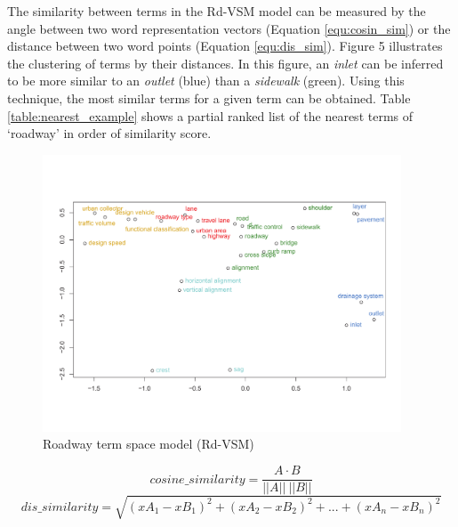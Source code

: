 \documentclass[Journal, BackFigs,NoLists, DoubleSpace]{ascelike}%
\begin{document}
\par
The similarity between terms in the Rd-VSM model can be measured by the angle between two word representation vectors (Equation \ref{equ:cosin_sim}) or the distance between two word points (Equation \ref{equ:dis_sim}). Figure 5 illustrates the clustering of terms by their distances. In this figure, an \textit{inlet} can be inferred to be more similar to an \textit{outlet} (blue) than a \textit{sidewalk} (green). Using this technique, the most similar terms for a given term can be obtained. Table \ref{table:nearest_example} shows a partial ranked list of the nearest terms of `roadway' in order of similarity score.
%
\begin{figure}[t]
	\centering
	\includegraphics[width=0.95\textwidth]{Figure5_hvsm_space}
	\caption{Roadway term space model (Rd-VSM)}
	\label{fig:hvsm}
\end{figure}
%
\begin{equation}
\label{equ:cosin_sim}
cosine\_similarity = \frac{A \cdot B}{||A|| \: ||B||}
\end{equation}
%
\begin{equation}
\label{equ:dis_sim}
dis\_similarity =\sqrt{(xA_1-xB_1)^2+(xA_2-xB_2)^2+...+(xA_n-xB_n)^2}
\end{equation}
\end{document}
